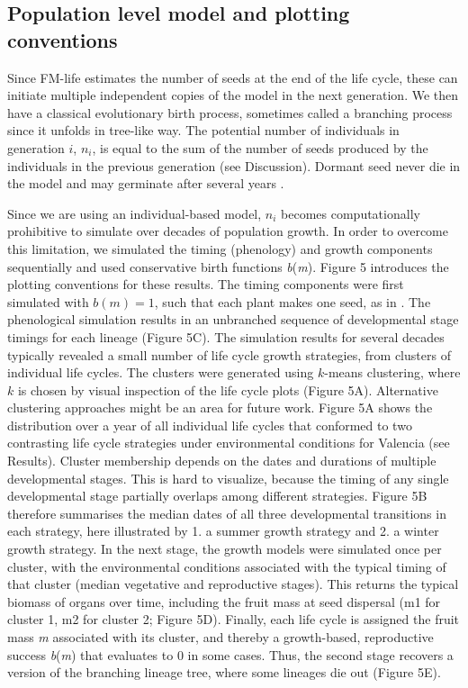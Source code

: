 \documentclass[phd]{infthesis}
\begin{document}
\subsection{Population level model and plotting
  conventions}
\label{population-level-model-and-plotting-conventions}

Since FM-life estimates the number of seeds at the end of the life
cycle, these can initiate multiple independent copies of the model in
the next generation. We then have a classical evolutionary birth
process, sometimes called a branching process since it unfolds in
tree-like way. The potential number of individuals in generation \(i\),
\(n_{i}\), is equal to the sum of the number of seeds produced by the
individuals in the previous generation (see Discussion). Dormant seed
never die in the model and may germinate after several years \citep{burghardt_modeling_2015}.

Since we are using an individual-based model, \(n_{i}\) becomes computationally
prohibitive to simulate over decades of population growth. In order to overcome
this limitation, we simulated the timing (phenology) and growth components
sequentially and used conservative birth functions \emph{b}(\emph{m}). Figure 5
introduces the plotting conventions for these results. The timing components
were first simulated with \(b(m) = 1\), such that each plant makes one seed, as
in \citet{(Burghardt et al., 2015).}. The phenological simulation results in an
unbranched sequence of developmental stage timings for each lineage (Figure
5C). The simulation results for several decades typically revealed a small
number of life cycle growth strategies, from clusters of individual life
cycles. The clusters were generated using \(k\)-means clustering, where \(k\) is
chosen by visual inspection of the life cycle plots (Figure 5A). Alternative
clustering approaches might be an area for future work. Figure 5A shows the
distribution over a year of all individual life cycles that conformed to two
contrasting life cycle strategies under environmental conditions for Valencia
(see Results).  Cluster membership depends on the dates and durations of
multiple developmental stages. This is hard to visualize, because the timing of
any single developmental stage partially overlaps among different
strategies. Figure 5B therefore summarises the median dates of all three
developmental transitions in each strategy, here illustrated by 1. a summer
growth strategy and 2. a winter growth strategy. In the next stage, the growth
models were simulated once per cluster, with the environmental conditions
associated with the typical timing of that cluster (median vegetative and
reproductive stages). This returns the typical biomass of organs over time,
including the fruit mass at seed dispersal (m1 for cluster 1, m2 for cluster 2;
Figure 5D). Finally, each life cycle is assigned the fruit mass \emph{m}
associated with its cluster, and thereby a growth-based, reproductive success
\emph{b}(\emph{m}) that evaluates to 0 in some cases. Thus, the second stage
recovers a version of the branching lineage tree, where some lineages die out
(Figure 5E).
\end{document}
